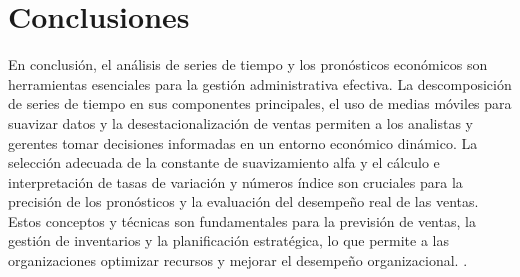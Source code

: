 {\clearpage
\section{Conclusiones}
En conclusión, el análisis de series de tiempo y los pronósticos económicos son herramientas esenciales para la gestión administrativa efectiva. La descomposición de series de tiempo en sus componentes principales, el uso de medias móviles para suavizar datos y la desestacionalización de ventas permiten a los analistas y gerentes tomar decisiones informadas en un entorno económico dinámico. La selección adecuada de la constante de suavizamiento alfa y el cálculo e interpretación de tasas de variación y números índice son cruciales para la precisión de los pronósticos y la evaluación del desempeño real de las ventas. Estos conceptos y técnicas son fundamentales para la previsión de ventas, la gestión de inventarios y la planificación estratégica, lo que permite a las organizaciones optimizar recursos y mejorar el desempeño organizacional. \citep{anderson2012,lind2012,wackerly2010,diazRodriguez2022}.
}

